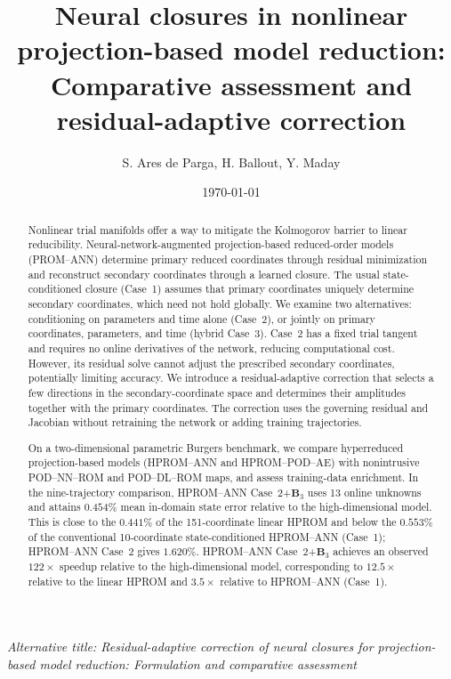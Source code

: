 \documentclass[11pt]{article}
\title{\vspace{-1.5em}Neural closures in nonlinear projection-based model reduction: Comparative assessment and residual-adaptive correction}
\author{S. Ares de Parga, H. Ballout, Y. Maday}
\date{\today}
\begin{document}
\maketitle
\vspace{-1.0em}
\begin{center}
\small\emph{Alternative title: Residual-adaptive correction of neural closures for projection-based model reduction: Formulation and comparative assessment}
\end{center}
\vspace{-1.0em}

\begin{abstract}
Nonlinear trial manifolds offer a way to mitigate the Kolmogorov barrier
to linear reducibility.  Neural-network-augmented projection-based
reduced-order models (PROM--ANN) determine primary reduced coordinates
through residual minimization and reconstruct secondary coordinates
through a learned closure.
The usual state-conditioned closure (Case~1) assumes that primary
coordinates uniquely determine secondary coordinates, which need not hold
globally.  We examine two alternatives: conditioning on parameters and
time alone (Case~2), or jointly on primary coordinates, parameters, and
time (hybrid Case~3).  Case~2 has a fixed trial tangent and requires no online
derivatives of the network, reducing computational cost.  However, its
residual solve cannot adjust the prescribed secondary coordinates,
potentially limiting accuracy.  We introduce a residual-adaptive
correction that selects a few directions in the secondary-coordinate
space and determines their amplitudes together with the primary
coordinates.  The correction uses the governing residual and Jacobian
without retraining the network or adding training trajectories.

On a two-dimensional parametric Burgers benchmark, we compare hyperreduced
projection-based models (HPROM--ANN and HPROM--POD--AE) with nonintrusive
POD--NN--ROM and POD--DL--ROM
maps, and assess training-data enrichment.  In the nine-trajectory
comparison, HPROM--ANN Case~2+$\mathbf B_3$ uses 13 online unknowns and
attains $0.454\%$ mean in-domain state
error relative to the high-dimensional model.  This is close to the
$0.441\%$ of the 151-coordinate linear HPROM and below the $0.553\%$ of
the conventional 10-coordinate state-conditioned HPROM--ANN (Case~1);
HPROM--ANN Case~2 gives $1.620\%$.  HPROM--ANN Case~2+$\mathbf B_3$ achieves an
observed $122\times$ speedup relative to the high-dimensional model,
corresponding to $12.5\times$ relative to the linear HPROM and $3.5\times$
relative to HPROM--ANN (Case~1).
\end{abstract}
\end{document}
